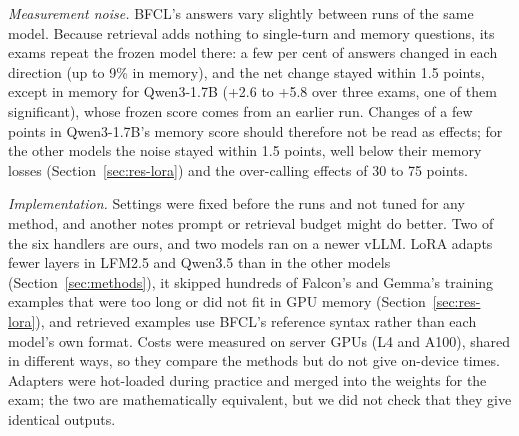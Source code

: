 \documentclass[a4paper,fleqn]{cas-dc}
\begin{document}
\emph{Measurement noise.} BFCL's answers vary slightly between runs of the same model. Because retrieval adds nothing
to single-turn and memory questions, its exams repeat the frozen model there: a few per cent of answers changed in each
direction (up to 9\% in memory), and the net change stayed within 1.5 points, except in memory for Qwen3-1.7B (+2.6 to
+5.8 over three exams, one of them significant), whose frozen score comes from an earlier run. Changes of a few points in Qwen3-1.7B's memory score should therefore not be read as effects; for the other models
the noise stayed within 1.5 points, well below their memory losses (Section~\ref{sec:res-lora}) and the over-calling
effects of 30 to 75 points.

\emph{Implementation.} Settings were fixed before the runs and not tuned for any method, and another notes prompt or
retrieval budget might do better. Two of the six handlers are ours, and two models ran on a newer vLLM. LoRA adapts
fewer layers in LFM2.5 and Qwen3.5 than in the other models (Section~\ref{sec:methods}), it skipped hundreds of Falcon's and Gemma's training examples that were too long or did not fit in GPU memory (Section~\ref{sec:res-lora}), and retrieved examples use
BFCL's reference syntax rather than each model's own format. Costs were measured on server GPUs (L4 and A100), shared
in different ways, so they compare the methods but do not give on-device times. Adapters were hot-loaded during
practice and merged into the weights for the exam; the two are mathematically equivalent, but we did not check that they
give identical outputs.
\end{document}
